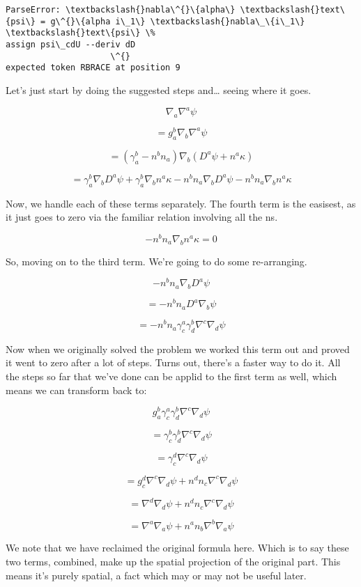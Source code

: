 \documentclass[landscape,letterpaper,10pt,english]{article}
\begin{document}
    \begin{Verbatim}[commandchars=\\\{\}]
ParseError: \textbackslash{}nabla\^{}\{alpha\} \textbackslash{}text\{psi\} = g\^{}\{alpha i\_1\} \textbackslash{}nabla\_\{i\_1\} \textbackslash{}text\{psi\} \%
assign psi\_cdU --deriv dD
                     \^{}
expected token RBRACE at position 9
    \end{Verbatim}

    Let's just start by doing the suggested steps and\ldots{} seeing where
it goes.

\[\nabla_a \nabla^a \psi\]

\[ = g^b_a \nabla_b \nabla^a \psi \]

\[ = (\gamma^b_a - n^bn_a) \nabla_b (D^a \psi + n^a \kappa) \]

\[ = \gamma^b_a\nabla_b D^a \psi + \gamma^b_a \nabla_b n^a \kappa -n^bn_a \nabla_b D^a \psi - n^bn_a \nabla_b n^a \kappa \]

    Now, we handle each of these terms separately. The fourth term is the
easisest, as it just goes to zero via the familiar relation involving
all the ns.

\[ -n^bn_a \nabla_b n^a \kappa = 0 \]

So, moving on to the third term. We're going to do some re-arranging.

\[ -n^bn_a \nabla_b D^a \psi \]

\[ = -n^bn_a D^a \nabla_b \psi \]

\[ = -n^bn_a \gamma^a_c \gamma_d^b \nabla^c \nabla_d \psi \]

Now when we originally solved the problem we worked this term out and
proved it went to zero after a lot of steps. Turns out, there's a faster
way to do it. All the steps so far that we've done can be applid to the
first term as well, which means we can transform back to:

\[ g^b_a \gamma^a_c \gamma_d^b \nabla^c \nabla_d \psi \]

\[ = \gamma^b_c \gamma_d^b \nabla^c \nabla_d \psi \]

\[ = \gamma^d_c \nabla^c \nabla_d \psi \]

\[ = g^d_c \nabla^c \nabla_d \psi + n^dn_c \nabla^c \nabla_d \psi \]

\[ = \nabla^d \nabla_d \psi + n^dn_c \nabla^c \nabla_d \psi \]

\[ = \nabla^a \nabla_a \psi + n^an_b \nabla^b \nabla_a \psi \]

We note that we have reclaimed the original formula here. Which is to
say these two terms, combined, make up the spatial projection of the
original part. This means it's purely spatial, a fact which may or may
not be useful later.
\end{document}
